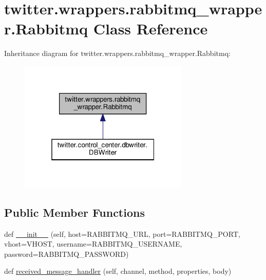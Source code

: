 \hypertarget{classtwitter_1_1wrappers_1_1rabbitmq__wrapper_1_1Rabbitmq}{}\section{twitter.\+wrappers.\+rabbitmq\+\_\+wrapper.\+Rabbitmq Class Reference}
\label{classtwitter_1_1wrappers_1_1rabbitmq__wrapper_1_1Rabbitmq}


Inheritance diagram for twitter.\+wrappers.\+rabbitmq\+\_\+wrapper.\+Rabbitmq\+:\nopagebreak
\begin{figure}[H]
\begin{center}
\leavevmode
\includegraphics[width=229pt]{classtwitter_1_1wrappers_1_1rabbitmq__wrapper_1_1Rabbitmq__inherit__graph}
\end{center}
\end{figure}
\subsection*{Public Member Functions}
\begin{DoxyCompactItemize}
\item 
def \hyperlink{classtwitter_1_1wrappers_1_1rabbitmq__wrapper_1_1Rabbitmq_aa137a552cf99777a1effb7737d475663}{\+\_\+\+\_\+init\+\_\+\+\_\+} (self, host=R\+A\+B\+B\+I\+T\+M\+Q\+\_\+\+U\+RL, port=R\+A\+B\+B\+I\+T\+M\+Q\+\_\+\+P\+O\+RT, vhost=V\+H\+O\+ST, username=R\+A\+B\+B\+I\+T\+M\+Q\+\_\+\+U\+S\+E\+R\+N\+A\+ME, password=R\+A\+B\+B\+I\+T\+M\+Q\+\_\+\+P\+A\+S\+S\+W\+O\+RD)
\item 
def \hyperlink{classtwitter_1_1wrappers_1_1rabbitmq__wrapper_1_1Rabbitmq_a910cadec1f119ffca78becc55af22a43}{received\+\_\+message\+\_\+handler} (self, channel, method, properties, body)
\end{DoxyCompactItemize}
